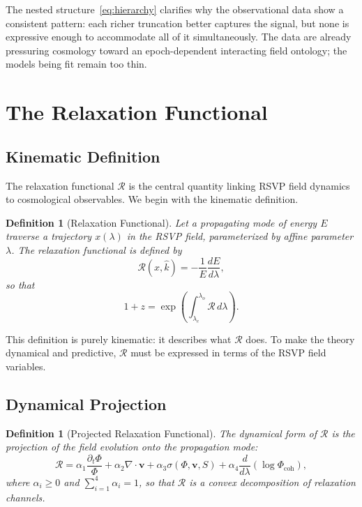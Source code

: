 \documentclass[12pt,a4paper]{article}
\newtheorem{definition}[theorem]{Definition}
\theoremstyle{remark}
\newcommand{\vv}{\mathbf{v}}
\newcommand{\Rcal}{\mathcal{R}}
\begin{document}
The nested structure~\eqref{eq:hierarchy} clarifies why the observational data show a consistent pattern: each richer truncation better captures the signal, but none is expressive enough to accommodate all of it simultaneously. The data are already pressuring cosmology toward an epoch-dependent interacting field ontology; the models being fit remain too thin.

\section{The Relaxation Functional}
\label{sec:relaxation}

\subsection{Kinematic Definition}

The relaxation functional $\Rcal$ is the central quantity linking RSVP field dynamics to cosmological observables. We begin with the kinematic definition.

\begin{definition}[Relaxation Functional]
Let a propagating mode of energy $E$ traverse a trajectory $x(\lambda)$ in the RSVP field, parameterized by affine parameter $\lambda$. The relaxation functional is defined by
\begin{equation}
\boxed{\Rcal(x, \hat{k}) = -\frac{1}{E}\frac{dE}{d\lambda},}
\label{eq:R_kinematic}
\end{equation}
so that
\begin{equation}
1 + z = \exp\!\left(\int_{\lambda_e}^{\lambda_o} \Rcal\, d\lambda\right).
\label{eq:redshift_R}
\end{equation}
\end{definition}

This definition is purely kinematic: it describes what $\Rcal$ does. To make the theory dynamical and predictive, $\Rcal$ must be expressed in terms of the RSVP field variables.

\subsection{Dynamical Projection}

\begin{definition}[Projected Relaxation Functional]
The dynamical form of $\Rcal$ is the projection of the field evolution onto the propagation mode:
\begin{equation}
\boxed{\Rcal = \alpha_1 \frac{\partial_t \Phi}{\Phi} + \alpha_2 \nabla \cdot \vv + \alpha_3 \sigma(\Phi, \vv, S) + \alpha_4 \frac{d}{d\lambda}\!\left(\log \Phi_{\mathrm{coh}}\right),}
\label{eq:R_dynamic}
\end{equation}
where $\alpha_i \ge 0$ and $\sum_{i=1}^4 \alpha_i = 1$, so that $\Rcal$ is a convex decomposition of relaxation channels.
\end{definition}
\end{document}
